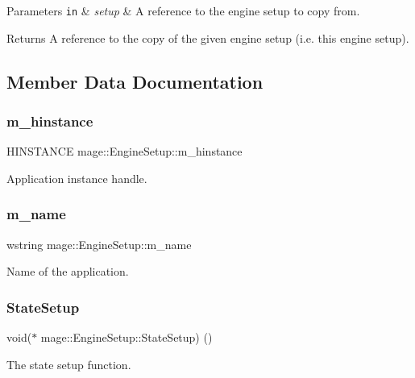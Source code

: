 \begin{DoxyParams}[1]{Parameters}
\mbox{\tt in}  & {\em setup} & A reference to the engine setup to copy from. \\
\hline
\end{DoxyParams}
\begin{DoxyReturn}{Returns}
A reference to the copy of the given engine setup (i.\+e. this engine setup). 
\end{DoxyReturn}


\subsection{Member Data Documentation}
\hypertarget{structmage_1_1_engine_setup_af91461305cd9aa60e22fa770395d2238}{}\label{structmage_1_1_engine_setup_af91461305cd9aa60e22fa770395d2238} 
\subsubsection{\texorpdfstring{m\+\_\+hinstance}{m\_hinstance}}
{\footnotesize\ttfamily H\+I\+N\+S\+T\+A\+N\+CE mage\+::\+Engine\+Setup\+::m\+\_\+hinstance}

Application instance handle. \hypertarget{structmage_1_1_engine_setup_a3866920e44c0752a89265f9f0c5c5d05}{}\label{structmage_1_1_engine_setup_a3866920e44c0752a89265f9f0c5c5d05} 
\subsubsection{\texorpdfstring{m\+\_\+name}{m\_name}}
{\footnotesize\ttfamily wstring mage\+::\+Engine\+Setup\+::m\+\_\+name}

Name of the application. \hypertarget{structmage_1_1_engine_setup_a36a3c8a316c63e6c90ee9dd6efb82c0c}{}\label{structmage_1_1_engine_setup_a36a3c8a316c63e6c90ee9dd6efb82c0c} 
\subsubsection{\texorpdfstring{State\+Setup}{StateSetup}}
{\footnotesize\ttfamily void($\ast$ mage\+::\+Engine\+Setup\+::\+State\+Setup) ()}

The state setup function. 